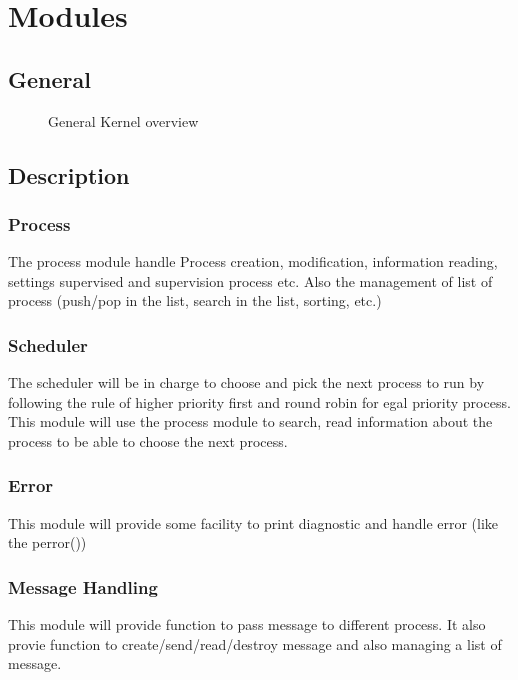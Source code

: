 \chapter{Modules}

\section{General}

\begin{figure}[h!]
  \begin{center}
	 
  \end{center}
  \caption{General Kernel overview}
  \label{fig:gen_kernel}
\end{figure}

\section{Description}
\subsection{Process}

The process module handle Process creation, modification, information reading, settings supervised and supervision process etc. Also the management of list of process (push/pop in the list, search in the list, sorting, etc.)

\subsection{Scheduler}

The scheduler will be in charge to choose and pick the next process to run by following the rule of higher priority first and round robin for egal priority process.
This module will use the process module to search, read information about the process to be able to choose the next process.

\subsection{Error}

This module will provide some facility to print diagnostic and handle error (like the perror())

\subsection{Message Handling}

This module will provide function to pass message to different process. It also provie function to create/send/read/destroy message and also managing a list of message.

